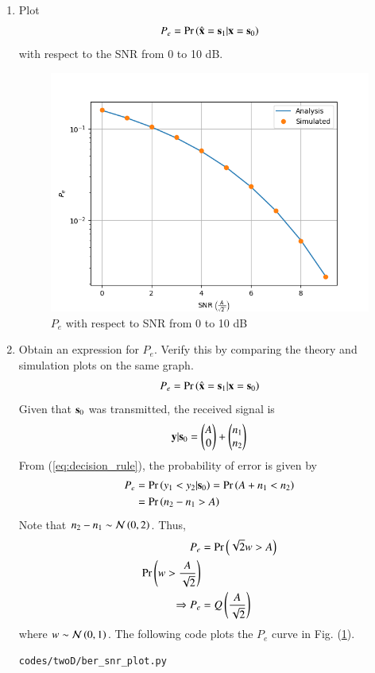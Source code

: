 \begin{enumerate}[label=\thesection.\arabic*.,ref=\thesection.\theenumi]
\item
Plot 
\begin{equation} 
P_e = \Pr\left(\hat{\mathbf{x}} = \mathbf{s}_1|\mathbf{x} = \mathbf{s}_0\right)
\end{equation}
with respect to the SNR from 0 to 10 dB.
\\
\begin{figure}
\centering
\includegraphics[width=\columnwidth]{./figs/twoD/ber_snr_plot.png}
\caption{$P_e$ with respect to SNR from 0 to 10 dB}
\label{fig:ber_snr_plot}
\end{figure}
%
\item
Obtain an expression for $P_e$. Verify this by comparing the theory and simulation plots on the same graph.
\\
\solution 
\begin{align}
P_e = \Pr\left(\hat{\mathbf{x}} = \mathbf{s}_1|\mathbf{x} = \mathbf{s}_0\right)
\end{align}
Given that $\mathbf{s}_0$ was transmitted, the received signal is
\begin{align}
\mathbf{y}|\mathbf{s}_0 = \begin{pmatrix} A \\ 0 \end{pmatrix} + \begin{pmatrix} n_1 \\ n_2 \end{pmatrix}
\end{align}
From (\ref{eq:decision_rule}), the probability of error is given by 
\begin{align}
P_e &= \Pr\left(y_1 < y_2 |\mathbf{s}_0\right) = \Pr\left(A+n_1 < n_2\right)\\
&= \Pr\left(n_2 - n_1 > A\right)
\end{align}
Note that $n_2 - n_1 \sim \mathcal{N}\left(0,2\right)$. Thus,
\begin{align}
P_e &= \Pr\left(\sqrt{2}w > A\right)\\
\Pr\left(w > \dfrac{A}{\sqrt{2}}\right)\\
\Rightarrow P_e &= Q\left(\frac{A}{\sqrt{2}}\right)
\end{align}
where $w \sim \mathcal{N}\left(0,1\right)$. The following code plots the $P_e$ curve in Fig. (\ref{fig:ber_snr_plot}).
\begin{lstlisting}
codes/twoD/ber_snr_plot.py
\end{lstlisting}
\end{enumerate}
